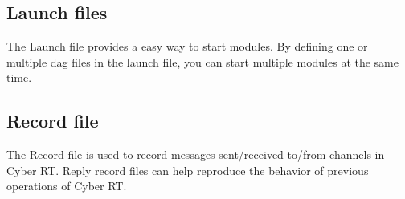 \subsection*{Launch files}

The Launch file provides a easy way to start modules. By defining one or multiple dag files in the launch file, you can start multiple modules at the same time.

\subsection*{Record file}

The Record file is used to record messages sent/received to/from channels in Cyber R\-T. Reply record files can help reproduce the behavior of previous operations of Cyber R\-T. 